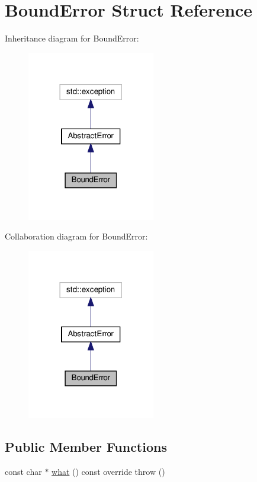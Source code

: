 \hypertarget{structBoundError}{}\section{Bound\+Error Struct Reference}
\label{structBoundError}


Inheritance diagram for Bound\+Error\+:\nopagebreak
\begin{figure}[H]
\begin{center}
\leavevmode
\includegraphics[width=158pt]{structBoundError__inherit__graph}
\end{center}
\end{figure}


Collaboration diagram for Bound\+Error\+:\nopagebreak
\begin{figure}[H]
\begin{center}
\leavevmode
\includegraphics[width=158pt]{structBoundError__coll__graph}
\end{center}
\end{figure}
\subsection*{Public Member Functions}
\begin{DoxyCompactItemize}
\item 
const char $\ast$ \hyperlink{structBoundError_a58ec01d9e329a9604cda74a8c273879a}{what} () const override  throw ()
\end{DoxyCompactItemize}


